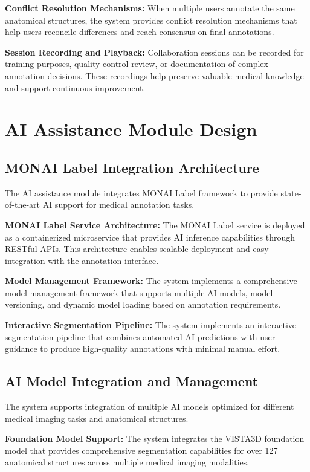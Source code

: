\textbf{Conflict Resolution Mechanisms:} When multiple users annotate the same anatomical structures, the system provides conflict resolution mechanisms that help users reconcile differences and reach consensus on final annotations.

\textbf{Session Recording and Playback:} Collaboration sessions can be recorded for training purposes, quality control review, or documentation of complex annotation decisions. These recordings help preserve valuable medical knowledge and support continuous improvement.

\section{AI Assistance Module Design}

\subsection{MONAI Label Integration Architecture}

The AI assistance module integrates MONAI Label framework to provide state-of-the-art AI support for medical annotation tasks.

\textbf{MONAI Label Service Architecture:} The MONAI Label service is deployed as a containerized microservice that provides AI inference capabilities through RESTful APIs. This architecture enables scalable deployment and easy integration with the annotation interface.

\textbf{Model Management Framework:} The system implements a comprehensive model management framework that supports multiple AI models, model versioning, and dynamic model loading based on annotation requirements.

\textbf{Interactive Segmentation Pipeline:} The system implements an interactive segmentation pipeline that combines automated AI predictions with user guidance to produce high-quality annotations with minimal manual effort.

\subsection{AI Model Integration and Management}

The system supports integration of multiple AI models optimized for different medical imaging tasks and anatomical structures.

\textbf{Foundation Model Support:} The system integrates the VISTA3D foundation model that provides comprehensive segmentation capabilities for over 127 anatomical structures across multiple medical imaging modalities.

